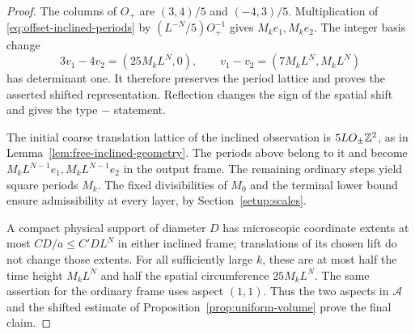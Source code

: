 \begin{proof}
The columns of $O_+$ are $(3,4)/5$ and $(-4,3)/5$.
Multiplication of \eqref{eq:offset-inclined-periods} by
$(L^{-N}/5)O_+^{-1}$ gives $M_ke_1,M_ke_2$.
The integer basis change
\[
 3v_1-4v_2=(25M_kL^N,0),\qquad
 v_1-v_2=(7M_kL^N,M_kL^N)
\]
has determinant one.  It therefore preserves the period lattice
and proves the asserted shifted representation.  Reflection changes
the sign of the spatial shift and gives the type $-$ statement.

The initial coarse translation lattice of the inclined observation
is $5L O_\pm\mathbb Z^2$, as in
Lemma~\ref{lem:free-inclined-geometry}.  The periods above belong
to it and become $M_kL^{N-1}e_1,M_kL^{N-1}e_2$ in the output
frame.  The remaining ordinary steps yield square periods $M_k$.
The fixed divisibilities of $M_0$ and the terminal lower bound
ensure admissibility at every layer, by
Section~\ref{setup:scales}.

A compact physical support of diameter $D$ has microscopic
coordinate extents at most $C D/a\le C'DL^N$ in either inclined
frame; translations of its chosen lift do not change those extents.
For all sufficiently large $k$, these are at most half the time
height $M_kL^N$ and half the spatial circumference $25M_kL^N$.
The same assertion for the ordinary frame uses aspect $(1,1)$.
Thus the two aspects in $\mathcal A$ and the shifted estimate of
Proposition~\ref{prop:uniform-volume} prove the final claim.
\end{proof}
